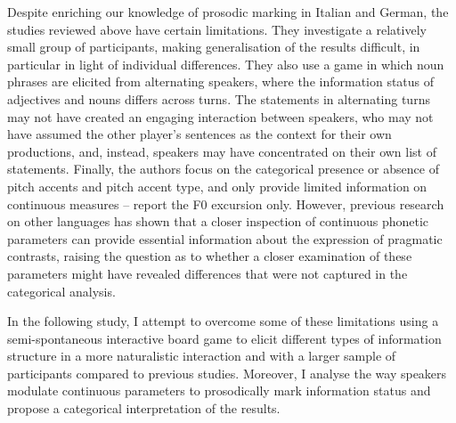 Despite enriching our knowledge of prosodic marking in Italian and German, the studies reviewed above have certain limitations. They investigate a relatively small group of participants, making generalisation of the results difficult, in particular in light of individual differences. They also use a game in which noun phrases are elicited from alternating speakers, where the information status of adjectives and nouns differs across turns. The statements in alternating turns may not have created an engaging interaction between speakers, who may not have assumed the other player’s sentences as the context for their own productions, and, instead, speakers may have concentrated on their own list of statements. Finally, the authors focus on the categorical presence or absence of pitch accents and pitch accent type, and only provide limited information on continuous measures – \citet{SwertsEtAl2002} report the F0 excursion only. However, previous research on other languages has shown that a closer inspection of continuous phonetic parameters can provide essential information about the expression of pragmatic contrasts, raising the question as to whether a closer examination of these parameters might have revealed differences that were not captured in the categorical analysis.

In the following study, I attempt to overcome some of these limitations using a semi-spontaneous interactive board game to elicit different types of information structure in a more naturalistic interaction and with a larger sample of participants compared to previous studies. Moreover, I analyse the way speakers modulate continuous parameters to prosodically mark information status and propose a categorical interpretation of the results.

